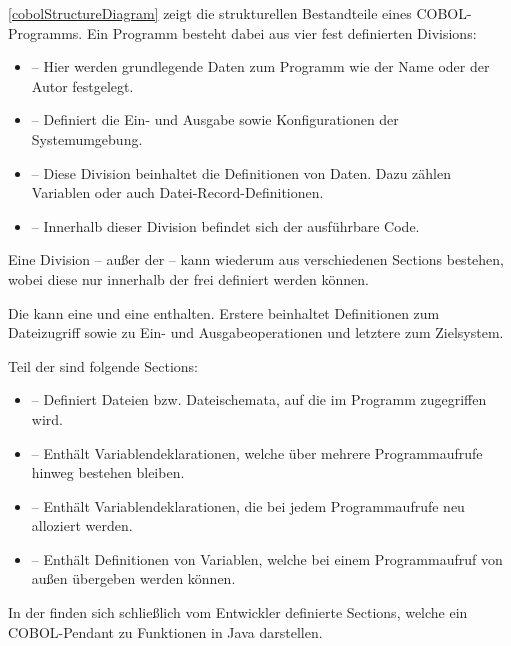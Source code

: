 \autoref{cobolStructureDiagram} zeigt die strukturellen Bestandteile eines COBOL-Programms. 
Ein Programm besteht dabei aus vier fest definierten Divisions:

\begin{itemize}
    \item {} -- Hier werden grundlegende Daten zum Programm wie der Name oder der Autor festgelegt.
    \item {} -- Definiert die Ein- und Ausgabe sowie Konfigurationen der Systemumgebung.
    \item {} -- Diese Division beinhaltet die Definitionen von Daten. Dazu zählen Variablen oder auch Datei-Record-Definitionen.
    \item {} -- Innerhalb dieser Division befindet sich der ausführbare Code.
\end{itemize}

Eine Division -- außer der  -- kann wiederum aus verschiedenen Sections bestehen, wobei diese nur innerhalb der  frei definiert werden können.

Die  kann eine  und eine  enthalten. Erstere beinhaltet Definitionen zum Dateizugriff sowie zu Ein- und Ausgabeoperationen und letztere zum Zielsystem.

Teil der  sind folgende Sections:
\begin{itemize}
    \item {} -- Definiert Dateien bzw. Dateischemata, auf die im Programm zugegriffen wird.
    \item {} -- Enthält Variablendeklarationen, welche über mehrere Programmaufrufe hinweg bestehen bleiben.
    \item {} -- Enthält Variablendeklarationen, die bei jedem Programmaufrufe neu alloziert werden.
    \item {} -- Enthält Definitionen von Variablen, welche bei einem Programmaufruf von außen übergeben werden können.
\end{itemize}

In der  finden sich schließlich vom Entwickler definierte Sections, welche ein COBOL-Pendant zu Funktionen in Java darstellen.

